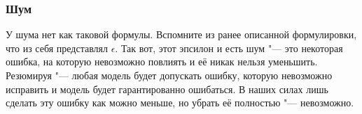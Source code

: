 \subsubsection*{Шум}

У шума нет как таковой формулы. Вспомните из ранее описанной формулировки, что из себя представлял $\epsilon$. Так вот, этот эпсилон и есть шум "--- это некоторая ошибка, на которую невозможно повлиять и её никак нельзя уменьшить. Резюмируя "--- любая модель будет допускать ошибку, которую невозможно исправить и модель будет гарантированно ошибаться. В наших силах лишь сделать эту ошибку как можно меньше, но убрать её полностью "--- невозможно.